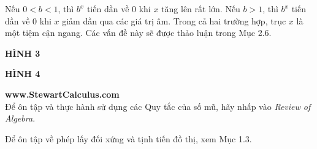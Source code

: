 
\noindent
\begin{minipage}[t]{0.265\textwidth}
    \fontsize{8pt}{10pt}\selectfont
    \vspace{3pt}
    \noindent Nếu $0 < b < 1$, thì $b^x$ tiến dần về $0$ khi $x$ tăng lên rất lớn. Nếu $b > 1$, thì $b^x$ tiến dần về $0$ khi $x$ giảm dần qua các giá trị âm. Trong cả hai trường hợp, trục $x$ là một tiệm cận ngang. Các vấn đề này sẽ được thảo luận trong Mục 2.6.

    \vspace{3pt}
    \begin{flushright}
        \textbf{\textsf{HÌNH 3}}
    \end{flushright}

    \vspace{3pt}
    \begin{flushright}
        \textbf{\textsf{HÌNH 4}}
    \end{flushright}

    \vspace{3pt}
    \begin{tcolorbox}[colback=black!4, colframe=black!15, arc=2mm, boxrule=0.5pt, left=4pt, right=4pt, top=4pt, bottom=4pt]
        \fontsize{7.5pt}{9.5pt}\selectfont
        \textbf{\textsf{www.StewartCalculus.com}}\\[2pt]
        Để ôn tập và thực hành sử dụng các Quy tắc của số mũ, hãy nhấp vào \textit{Review of Algebra}.
    \end{tcolorbox}

    \vspace{3pt}
    \noindent Để ôn tập về phép lấy đối xứng và tịnh tiến đồ thị, xem Mục 1.3.
\end{minipage}%
\hfill
